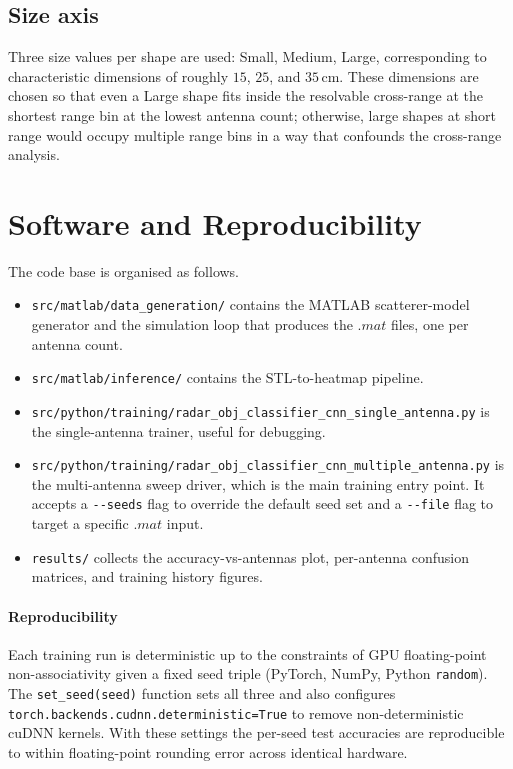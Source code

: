 \documentclass[letterpaper,11pt,leqno]{article}
\begin{document}
\subsection{Size axis}

Three size values per shape are used: Small, Medium, Large, corresponding to characteristic dimensions of roughly $15$, $25$, and $35$\,cm. These dimensions are chosen so that even a Large shape fits inside the resolvable cross-range at the shortest range bin at the lowest antenna count; otherwise, large shapes at short range would occupy multiple range bins in a way that confounds the cross-range analysis.

\section{Software and Reproducibility}\label{a:software}

The code base is organised as follows.
\begin{itemize}
\item \texttt{src/matlab/data\_generation/} contains the MATLAB scatterer-model generator and the simulation loop that produces the $.mat$ files, one per antenna count.
\item \texttt{src/matlab/inference/} contains the STL-to-heatmap pipeline.
\item \texttt{src/python/training/radar\_obj\_classifier\_cnn\_single\_antenna.py} is the single-antenna trainer, useful for debugging.
\item \texttt{src/python/training/radar\_obj\_classifier\_cnn\_multiple\_antenna.py} is the multi-antenna sweep driver, which is the main training entry point. It accepts a \texttt{-{}-seeds} flag to override the default seed set and a \texttt{-{}-file} flag to target a specific $.mat$ input.
\item \texttt{results/} collects the accuracy-vs-antennas plot, per-antenna confusion matrices, and training history figures.
\end{itemize}

\paragraph{Reproducibility} Each training run is deterministic up to the constraints of GPU floating-point non-associativity given a fixed seed triple (PyTorch, NumPy, Python \texttt{random}). The \texttt{set\_seed(seed)} function sets all three and also configures \texttt{torch.backends.cudnn.deterministic=True} to remove non-deterministic cuDNN kernels. With these settings the per-seed test accuracies are reproducible to within floating-point rounding error across identical hardware.
\end{document}
